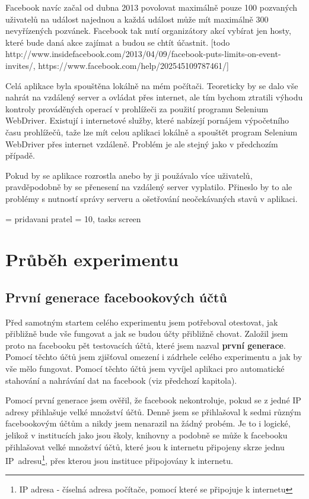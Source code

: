\documentclass[thesis=M,czech]{FITthesis}[2013/05/10]
\begin{document}
Facebook navíc začal od dubna 2013 povolovat maximálně pouze 100 pozvaných uživatelů na událost najednou a každá událost může mít maximálně 300 nevyřízených pozvánek. Facebook tak nutí organizátory akcí vybírat jen hosty, které bude daná akce zajímat a budou se chtít účastnit.
[todo http://www.insidefacebook.com/2013/04/09/facebook-puts-limits-on-event-invites/, https://www.facebook.com/help/202545109787461/]

Celá aplikace byla spouštěna lokálně na mém počítači. Teoreticky by se dalo vše nahrát na vzdálený server a ovládat přes internet, ale tím bychom ztratili výhodu kontroly prováděných operací v prohlížeči za použití programu Selenium WebDriver. Existují i internetové služby, které nabízejí pornájem výpočetního času prohlížečů, taže lze mít celou aplikaci lokálně a spouštět program Selenium WebDriver přes internet vzdáleně. Problém je ale stejný jako v předchozím případě.

Pokud by se aplikace rozrostla anebo by ji použávalo více uživatelů, pravděpodobně by se přenesení na vzdálený server vyplatilo. Přineslo by to ale problémy s nutností správy serveru a ošetřování neočekávaných stavů v aplikaci.

= pridavani pratel = 10, tasks screen




\chapter{Průběh experimentu}

\section{První generace facebookových účtů}

Před samotným startem celého experimentu jsem potřeboval otestovat, jak přibližně bude vše fungovat a jak se budou účty přibližně chovat. Založil jsem proto na facebooku pět testovacích účtů, které jsem nazval \textbf{první generace}. Pomocí těchto účtů jsem zjišťoval omezení i zádrhele celého experimentu a jak by vše mělo fungovat. Pomocí těchto účtů jsem vyvíjel aplikaci pro automatické stahování a nahrávání dat na facebook (viz předchozí kapitola).

Pomocí první generace jsem ověřil, že facebook nekontroluje, pokud se z jedné IP adresy přihlašuje velké množství účtů. Denně jsem se přihlašoval k sedmi různým facebookovým účtům a nikdy jsem nenarazil na žádný probém. Je to i logické, jelikož v institucích jako jsou školy, knihovny a podobně se může k facebooku přihlašovat velké množství účtů, které jsou k internetu připojeny skrze jednu IP~adresu\footnote{IP adresa - číselná adresa počítače, pomocí které se připojuje k internetu}, přes kterou jsou instituce připojovány k internetu.
\end{document}

